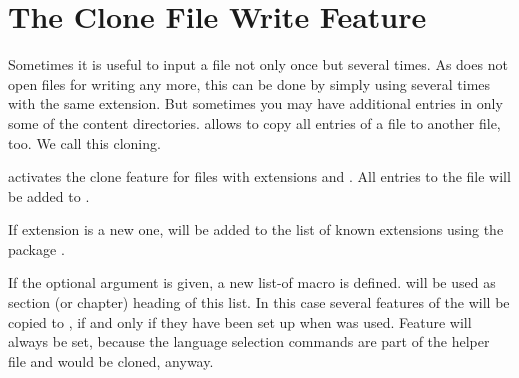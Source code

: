 \section{The Clone File Write Feature}

Sometimes it is useful to input a file not only once but several times. As
 does not open files for writing any more, this can be done
by simply using  several times with the same extension. But
sometimes you may have additional entries in only some of the content
directories.  allows to copy all entries of a file to
another file, too. We call this cloning.

\begin{Declaration}
\end{Declaration}
activates the clone feature for files with extensions  and
. All entries to the file
 will be added to
.

If extension  is a new one,  will be
added to the list of known extensions using the \KOMAScript{} package
.

If the optional argument  is given, a new list-of macro
 is defined.  will be used
as section (or chapter) heading of this list. In this case several
 features of the  will be copied to
, if and only if they have been set up when
 was used. Feature  will always be set,
because the language selection commands are part of the helper file and
would be cloned, anyway.

